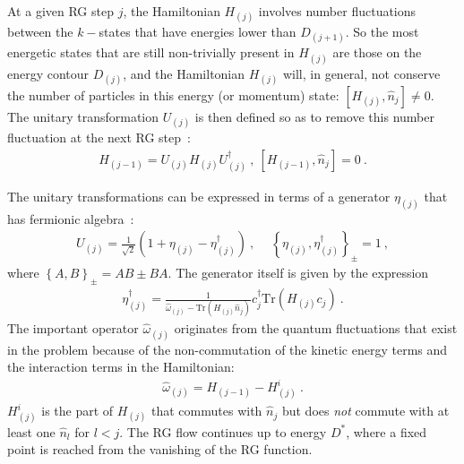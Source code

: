 \documentclass[reprint,superscriptaddress,floatfix]{revtex4-2}
\begin{document}
At a given RG step \(j\), the Hamiltonian \(H_{(j)}\) involves number fluctuations between the \(k-\)states that have energies lower than \(D_{(j+1)}\). So the most energetic states that are still non-trivially present in \(H_{(j)}\) are those on the energy contour \(D_{(j)}\), and the Hamiltonian \(H_{(j)}\) will, in general, not conserve the number of particles in this energy (or momentum) state: \(\left[H_{(j)}, \hat n_{j}\right] \neq 0\). The unitary transformation \(U_{(j)}\) is then defined so as to remove this number fluctuation at the next RG step~\cite{anirbanurg1,anirbanurg2}:
\begin{equation}\begin{aligned}
	H_{(j-1)} = U_{(j)} H_{(j)} U^\dagger_{(j)}~, ~\left[H_{(j-1)}, \hat n_{j}\right] =0~.
\end{aligned}\end{equation}

The unitary transformations can be expressed in terms of a generator \(\eta_{(j)}\) that has fermionic algebra~\cite{anirbanurg1,anirbanurg2}:
\begin{equation}\begin{aligned}
	U_{(j)} = \frac{1}{\sqrt 2}\left(1 + \eta_{(j)} - \eta_{(j)}^\dagger\right)~,~ \quad\left\{ \eta_{(j)},\eta_{(j)}^\dagger \right\}_\pm = 1~,
\end{aligned}\end{equation}
where \(\left\{A,B\right\}_\pm = AB \pm BA\). The generator itself is given by the expression~\cite{anirbanurg1,anirbanurg2}
\begin{equation}\begin{aligned}
	\eta^\dagger_{(j)} = \frac{1}{\hat \omega_{(j)} - \text{Tr}\left(H_{(j)} \hat n_{j}\right) } c^\dagger_{j} \text{Tr}\left(H_{(j)}c_{j}\right)~.
\end{aligned}\end{equation}
The important operator \(\hat \omega_{(j)}\) originates from the quantum fluctuations that exist in the problem because of the non-commutation of the kinetic energy terms and the interaction terms in the Hamiltonian:
\begin{equation}\begin{aligned}
	\hat \omega_{(j)} = H_{(j-1)} - H^i_{(j)}~.
\end{aligned}\end{equation}
\(H^i_{(j)}\) is the part of \(H_{(j)}\) that commutes with \(\hat n_j\) but does {\it not} commute with at least one \(\hat n_l\) for \(l < j\). The RG flow continues up to energy \(D^*\), where a fixed point is reached from the vanishing of the RG function. 
\end{document}
